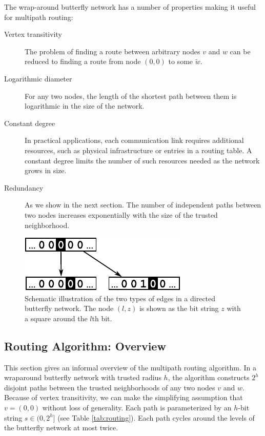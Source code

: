 \documentclass[prodmode,permissions]{acmsmall-ec16}
\begin{document}
The wrap-around butterfly network has a number of properties making it useful for multipath routing:
\begin{description}
\item[Vertex transitivity]
The problem
of finding a route between arbitrary nodes $v$ and $w$
can be reduced to finding a route from node $(0,0)$ to some $\tilde{w}$.
\item[Logarithmic diameter]
For any two nodes, the length of the shortest path between them is logarithmic
in the size of the network.
\item[Constant degree]
In practical applications, each communication link requires additional resources,
such as physical infrastructure or entries in a routing table.
A constant degree limits the number of such resources needed as the network
grows in size.
\item [Redundancy] 
As we show in the next section. The number of independent paths between two nodes increases exponentially with the size of the trusted neighborhood. 
\end{description}

\begin{figure}
\begin{center}
\includegraphics{fig-butterfly.pdf}
\end{center}
\caption{
Schematic illustration of the two types of edges in a directed butterfly network.
The node $(l,z)$ is shown as the bit string $z$ with a square around the $l$th bit.
\label{fig:butterfly}
}
\end{figure}

\subsection{Routing Algorithm: Overview}

This section gives an informal overview of the multipath routing algorithm.
In a wraparound butterfly network with trusted radius $h$,
the algorithm constructs $2^h$ disjoint paths between the trusted neighborhoods
of any two nodes $v$ and $w$. Because of vertex transitivity, we can make the simplifying assumption that $v = (0,0)$ without loss of generality. Each path is parameterized by an $h$-bit string $s \in (0,2^h]$ (see Table \ref{tab:routing}). Each path cycles around the levels of the butterfly network at most twice.
\end{document}
